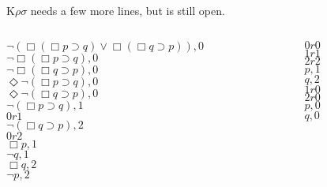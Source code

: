 \documentclass[
  14pt,
  letterpaper,
  ignorenonframetext,
]{beamer}
\begin{document}
\begin{frame}
K\(\rho \sigma\) needs a few more lines, but is still open.

\begin{columns}[T]
\begin{column}{0.65\textwidth}
\begin{center}
$\neg(\Box(\Box p \supset q) \vee \Box(\Box q \supset p)), 0$ \\
$\neg \Box(\Box p \supset q), 0$ \\
$\neg \Box(\Box q \supset p), 0$ \\
$\Diamond \neg(\Box p \supset q), 0$ \\
$\Diamond \neg(\Box q \supset p), 0$ \\
$\neg(\Box p \supset q), 1$ \\
$0r1$ \\
$\neg(\Box q \supset p), 2$ \\
$0r2$ \\
$\Box p, 1$ \\
$\neg q, 1$ \\
$\Box q, 2$ \\
$\neg p, 2$ \\
\end{center}
\end{column}

\begin{column}{0.35\textwidth}
\begin{center}
$0r0$ \\
$1r1$ \\
$2r2$ \\
$p, 1$ \\
$q, 2$ \\
$1r0$ \\
$2r0$ \\
$p, 0$ \\
$q, 0$
\end{center}
\end{column}
\end{columns}
\end{frame}
\end{document}
